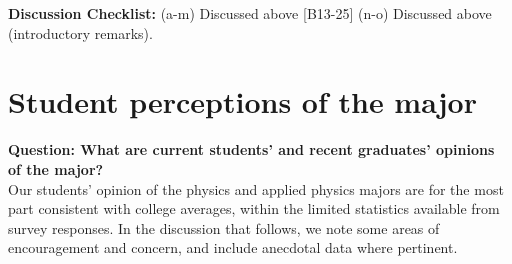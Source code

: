 \documentclass[12pt]{article}
\begin{document}
\noindent
{\bf Discussion Checklist:}
(a-m) Discussed above [B13-25] (n-o) Discussed above (introductory remarks).

\newpage
\section{Student perceptions of the major}
\label{sec:perceptions}

{\bf Question: What are current students' and recent graduates' opinions of the major? }\\

Our students' opinion of the physics and applied physics majors are
for the most part consistent with college averages, within the limited
statistics available from survey responses.  In the discussion that follows,
we note some areas of encouragement and concern, and include anecdotal
data where pertinent.\\

\end{document}
